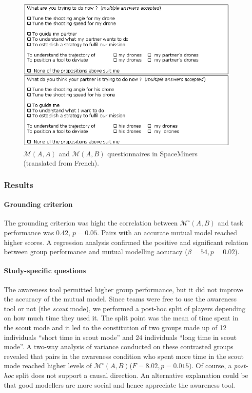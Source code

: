 \documentclass[natbib]{svjour3}
\newcommand{\gmodel}[2]{{$\mathcal{M}(#1, #2)$}}
\newcommand{\gModel}[2]{{$\mathcal{M}^{\circ}(#1, #2)$}}
\begin{document}
\begin{figure}[ht!]
        \centering
        \includegraphics[width=0.7\columnwidth]{image5.png}
        \caption{\gmodel{A}{A} and \gmodel{A}{B} questionnaires in SpaceMiners
        (translated from French).}

        \label{study1:questionnaires}
\end{figure}

\subsubsection*{Results}

\paragraph{Grounding criterion} The grounding criterion was high: the
correlation between \gModel{A}{B} and task performance was 0.42, $p = 0.05$.
Pairs with an accurate mutual model reached higher scores. A regression analysis
confirmed the positive and significant relation between group performance and
mutual modelling accuracy ($\beta=54, p = 0.02$).

\paragraph{Study-specific questions} The awareness tool permitted higher group
performance, but it did not improve the accuracy of the mutual model. Since
teams were free to use the awareness tool or not (the \emph{scout} mode), we
performed a post-hoc split of players depending on how much time they used it.
The split point was the mean of time spent in the scout mode and it led to the
constitution of two groups made up of 12 individuals ``short time in scout
mode'' and 24 individuals ``long time in scout mode''. A two-way analysis of
variance conducted on these contrasted groups revealed that pairs in the
awareness condition who spent more time in the scout mode reached higher levels
of \gModel{A}{B}($F = 8.02, p = 0.015$). Of course, a \textit{post-hoc} split
does not support a causal direction. An alternative explanation could be that
good modellers are more social and hence appreciate the awareness tool.
\end{document}
